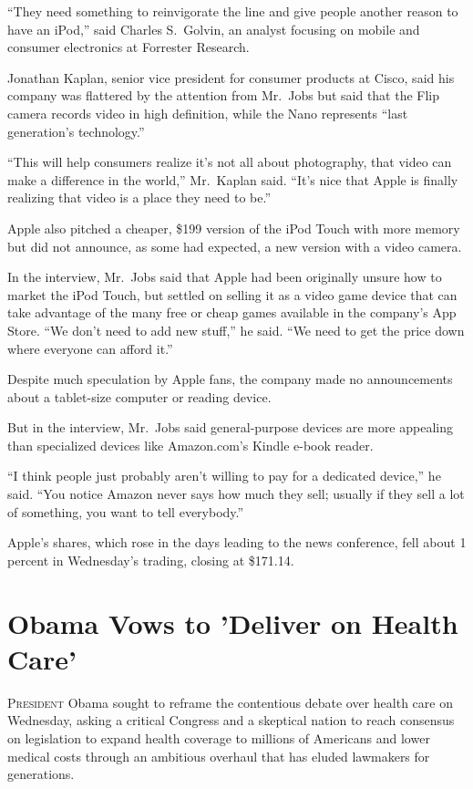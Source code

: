 ﻿\documentclass[12pt]{article}
\begin{document}
``They need something to reinvigorate the line and give people another reason to have an iPod,''
said Charles S.~Golvin, an analyst focusing on mobile and consumer electronics at Forrester
Research.

Jonathan Kaplan, senior vice president for consumer products at Cisco, said his company was
flattered by the attention from Mr.~Jobs but said that the Flip camera records video in high
definition, while the Nano represents ``last generation's technology.''

``This will help consumers realize it's not all about photography, that video can make a difference
in the world,'' Mr.~Kaplan said. ``It's nice that Apple is finally realizing that video is a place
they need to be.''

Apple also pitched a cheaper, \$199 version of the iPod Touch with more memory but did not announce,
as some had expected, a new version with a video camera.

In the interview, Mr.~Jobs said that Apple had been originally unsure how to market the iPod Touch,
but settled on selling it as a video game device that can take advantage of the many free or cheap
games available in the company's App Store. ``We don't need to add new stuff,'' he said. ``We need
to get the price down where everyone can afford it.''

Despite much speculation by Apple fans, the company made no announcements about a tablet-size
computer or reading device.

But in the interview, Mr.~Jobs said general-purpose devices are more appealing than specialized
devices like Amazon.com's Kindle e-book reader.

``I think people just probably aren't willing to pay for a dedicated device,'' he said. ``You notice
Amazon never says how much they sell; usually if they sell a lot of something, you want to tell
everybody.''

Apple's shares, which rose in the days leading to the news conference, fell about 1 percent in
Wednesday's trading, closing at \$171.14.

\section{Obama Vows to 'Deliver on Health Care'}

\lettrine{P}{resident} Obama sought to reframe the contentious debate over health care on Wednesday,
asking a critical Congress and a skeptical nation to reach consensus on legislation to expand health
coverage to millions of Americans and lower medical costs through an ambitious overhaul that has
eluded lawmakers for generations.
\end{document}
